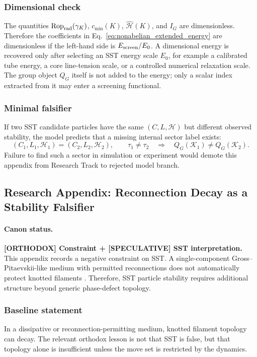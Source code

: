 \subsubsection{Dimensional check}
The quantities $\operatorname{Rop}_{\rm rad}(\gamma_K)$, $c_{\min}(K)$, $\widehat{\mathcal H}(K)$, and $I_G$ are dimensionless.  Therefore the coefficients in Eq.~\eqref{eq:nonabelian_extended_energy} are dimensionless if the left-hand side is $E_{\rm screen}/E_0$.  A dimensional energy is recovered only after selecting an SST energy scale $E_0$, for example a calibrated tube energy, a core line-tension scale, or a controlled numerical relaxation scale.  The group object $Q_G$ itself is not added to the energy; only a scalar index extracted from it may enter a screening functional.

\subsubsection{Minimal falsifier}
If two SST candidate particles have the same $(C,L,\mathcal H)$ but different observed stability, the model predicts that a missing internal sector label exists:
\begin{equation}
    (C_1,L_1,\mathcal H_1)=(C_2,L_2,\mathcal H_2),
    \qquad
    \tau_1\neq \tau_2
    \quad\Rightarrow\quad
    Q_G(\mathcal K_1)\neq Q_G(\mathcal K_2).
\end{equation}
Failure to find such a sector in simulation or experiment would demote this appendix from Research Track to rejected model branch.

\subsection{Research Appendix: Reconnection Decay as a Stability Falsifier}
\label{app:reconnection_decay_falsifier}

\paragraph{Canon status.}
\textbf{[ORTHODOX] Constraint + [SPECULATIVE] SST interpretation.}
This appendix records a negative constraint on SST. A single-component Gross--Pitaevskii-like medium with permitted reconnections does not automatically protect knotted filaments \cite{Kleckner2016SuperfluidKnotsUntie}. Therefore, SST particle stability requires additional structure beyond generic phase-defect topology.

\subsubsection{Baseline statement}
In a dissipative or reconnection-permitting medium, knotted filament topology can decay. The relevant orthodox lesson is not that SST is false, but that topology alone is insufficient unless the move set is restricted by the dynamics.

